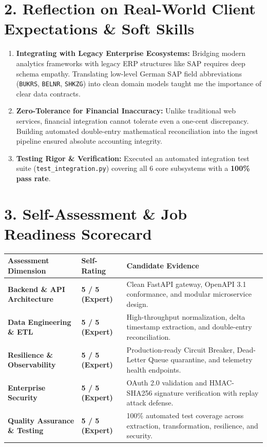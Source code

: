 \documentclass[11pt,a4paper]{article}
\begin{document}
\section{2. Reflection on Real-World Client Expectations \& Soft Skills}
\begin{enumerate}[leftmargin=1.5em, itemsep=3pt]
    \item \textbf{Integrating with Legacy Enterprise Ecosystems:} Bridging modern analytics frameworks with legacy ERP structures like SAP requires deep schema empathy. Translating low-level German SAP field abbreviations (\texttt{BUKRS}, \texttt{BELNR}, \texttt{SHKZG}) into clean domain models taught me the importance of clear data contracts.
    \item \textbf{Zero-Tolerance for Financial Inaccuracy:} Unlike traditional web services, financial integration cannot tolerate even a one-cent discrepancy. Building automated double-entry mathematical reconciliation into the ingest pipeline ensured absolute accounting integrity.
    \item \textbf{Testing Rigor \& Verification:} Executed an automated integration test suite (\texttt{test\_integration.py}) covering all 6 core subsystems with a \textbf{100\% pass rate}.
\end{enumerate}

\section{3. Self-Assessment \& Job Readiness Scorecard}
\begin{table}[h]
\centering
\small
\begin{tabular}{@{}llp{8.5cm}@{}}
\toprule
\textbf{Assessment Dimension} & \textbf{Self-Rating} & \textbf{Candidate Evidence} \\ \midrule
\textbf{Backend \& API Architecture} & \textbf{5 / 5 (Expert)} & Clean FastAPI gateway, OpenAPI 3.1 conformance, and modular microservice design. \\
\textbf{Data Engineering \& ETL} & \textbf{5 / 5 (Expert)} & High-throughput normalization, delta timestamp extraction, and double-entry reconciliation. \\
\textbf{Resilience \& Observability} & \textbf{5 / 5 (Expert)} & Production-ready Circuit Breaker, Dead-Letter Queue quarantine, and telemetry health endpoints. \\
\textbf{Enterprise Security} & \textbf{5 / 5 (Expert)} & OAuth 2.0 validation and HMAC-SHA256 signature verification with replay attack defense. \\
\textbf{Quality Assurance \& Testing} & \textbf{5 / 5 (Expert)} & 100\% automated test coverage across extraction, transformation, resilience, and security. \\ \bottomrule
\end{tabular}
\end{table}
\end{document}
